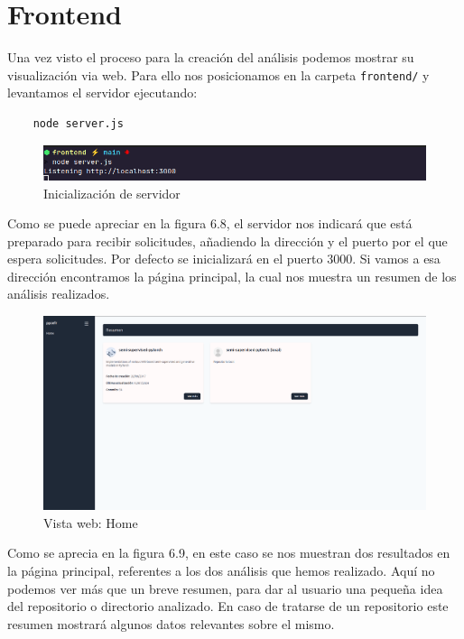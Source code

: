 \documentclass[a4paper, 12pt]{book}
\begin{document}
\section{Frontend}

Una vez visto el proceso para la creación del análisis podemos mostrar su visualización via web. Para ello nos posicionamos en la carpeta \texttt{frontend/} y levantamos el servidor ejecutando:

\begin{verbatim}
    node server.js
\end{verbatim}

\begin{figure}[H]
    \centering
    \includegraphics[width=\textwidth, keepaspectratio]{img/results/frontend_exe_console.png}
    \caption{Inicialización de servidor}
    \label{fig:frontend_console}
\end{figure}

Como se puede apreciar en la figura 6.8, el servidor nos indicará que está preparado para recibir solicitudes, añadiendo la dirección y el puerto por el que espera solicitudes. Por defecto se inicializará en el puerto 3000. Si vamos a esa dirección encontramos la página principal, la cual nos muestra un resumen de los análisis realizados.

\newpage
\vspace{1em}
\begin{figure}[H]
    \centering
    \includegraphics[width=\textwidth, keepaspectratio]{img/results/frontend_exe_home.png}
    \caption{Vista web: Home}
    \label{fig:frontend_home}
\end{figure}

Como se aprecia en la figura 6.9, en este caso se nos muestran dos resultados en la página principal, referentes a los dos análisis que hemos realizado. Aquí no podemos ver más que un breve resumen, para dar al usuario una pequeña idea del repositorio o directorio analizado. En caso de tratarse de un repositorio este resumen mostrará algunos datos relevantes sobre el mismo.
\end{document}
